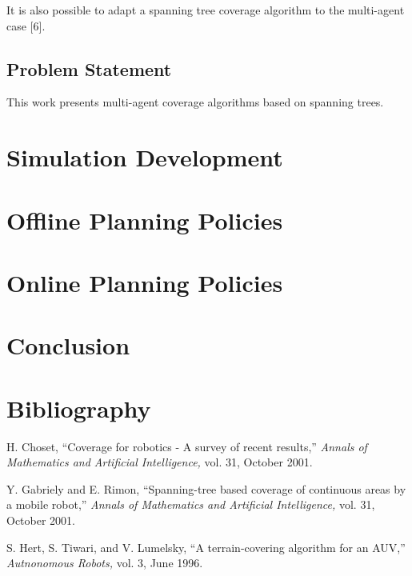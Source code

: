 \documentclass[letterpaper, 12pt, leqno]{report}
\begin{document}
It is also possible to adapt a spanning tree coverage algorithm to the multi-agent case [6].

\section{Problem Statement}

This work presents multi-agent coverage algorithms based on spanning trees.

\chapter{Simulation Development}

\chapter{Offline Planning Policies}

\chapter{Online Planning Policies}

\chapter{Conclusion}

\chapter{Bibliography}


\noindent [1] H. Choset, ``Coverage for robotics - A survey of recent results,'' \textit{Annals of \mbox{Mathematics} and Artificial Intelligence,} vol. 31, October 2001.

\noindent [2] Y. Gabriely and E. Rimon, ``Spanning-tree based coverage of continuous areas by a mobile robot,'' \textit{Annals of \mbox{Mathematics} and Artificial Intelligence,} vol. 31, October 2001.

\noindent [3] S. Hert, S. Tiwari, and V. Lumelsky, ``A terrain-covering algorithm for an AUV,'' \textit{Autnonomous Robots,} vol. 3, June 1996.
\end{document}
